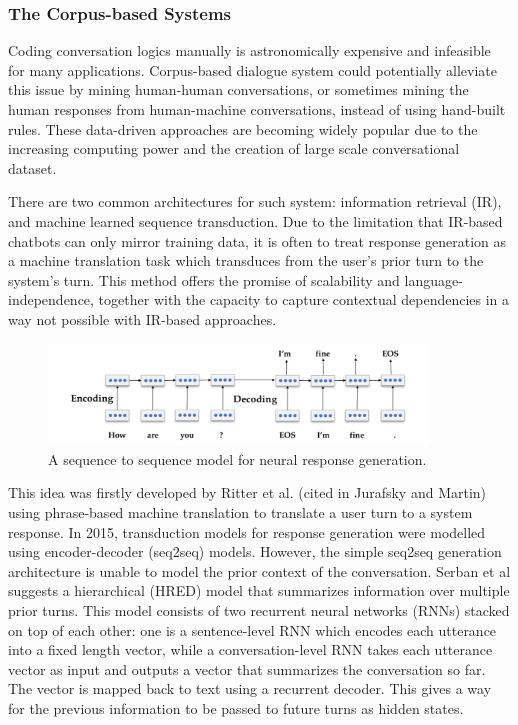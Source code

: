 \documentclass[bsc,frontabs,twoside,singlespacing,parskip,deptreport]{infthesis}     %
\begin{document}
\subsubsection*{The Corpus-based Systems}

Coding conversation logics manually is astronomically expensive and infeasible for many applications. Corpus-based dialogue system could potentially alleviate this issue by mining human-human conversations, or sometimes mining the human responses from human-machine conversations, instead of using hand-built rules. These data-driven approaches are becoming widely popular due to the increasing computing power and the creation of large scale conversational dataset. 

There are two common architectures for such system: information retrieval (IR), and machine learned sequence transduction. Due to the limitation that IR-based chatbots can only mirror training data, it is often to treat response generation as a machine translation task which transduces from the user’s prior turn to the system’s turn. This method offers the promise of scalability and language-independence, together with the capacity to capture contextual dependencies in a way not possible with IR-based approaches.

\begin{figure}[h]
    \centering
    \includegraphics[width=0.9\textwidth]{seq2seq.jpeg}
    \caption{A sequence to sequence model for neural response generation.\cite{jurafsky2019speech}}
    \label{fig:seq2seq}
\end{figure}

This idea was firstly developed by Ritter et al\cite{ritter2011data}. (cited in Jurafsky and Martin\cite{jurafsky2019speech}) using phrase-based machine translation to translate a user turn to a system response. In 2015, transduction models for response generation were modelled using encoder-decoder (seq2seq) models\cite{shang2015neural,strub2017end,sordoni2015neural}. However, the simple seq2seq generation architecture is unable to model the prior context of the conversation. Serban et al\cite{serban2016building} suggests a hierarchical (HRED) model that summarizes information over multiple prior turns. This model consists of two recurrent neural networks (RNNs) stacked on top of each other: one is a sentence-level RNN which encodes each utterance into a fixed length vector, while a conversation-level RNN takes each utterance vector as input and outputs a vector that summarizes the conversation so far. The vector is mapped back to text using a recurrent decoder. This gives a way for the previous information to be passed to future turns as hidden states\cite{lowe2017training}.
\end{document}
